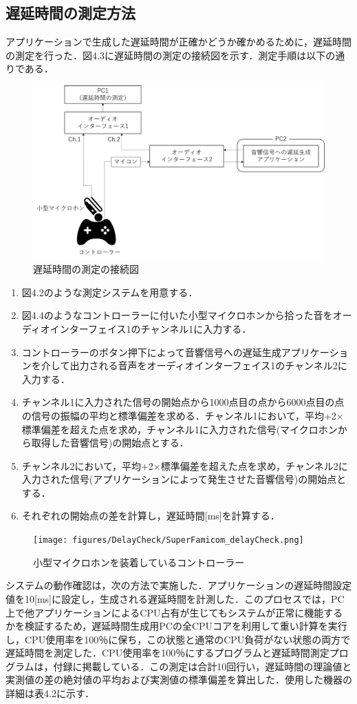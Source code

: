 \subsection{遅延時間の測定方法}
アプリケーションで生成した遅延時間が正確かどうか確かめるために，遅延時間の測定を行った．図4.3に遅延時間の測定の接続図を示す．測定手順は以下の通りである．
\begin{figure}[tb]
  \centering
  \includegraphics[scale=0.45]{figures/DelayCheck/DelayCheck_EX.png}
  \caption{遅延時間の測定の接続図}
\end{figure}
\begin{enumerate}[leftmargin=*]
  \item 図4.2のような測定システムを用意する．
  \item 図4.4のようなコントローラーに付いた小型マイクロホンから拾った音をオーディオインターフェイス1のチャンネル1に入力する．
  \item コントローラーのボタン押下によって音響信号への遅延生成アプリケーションを介して出力される音声をオーディオインターフェイス1のチャンネル2に入力する．
  \item チャンネル1に入力された信号の開始点から1000点目の点から6000点目の点の信号の振幅の平均と標準偏差を求める．チャンネル1において，平均+2×標準偏差を超えた点を求め，チャンネル1に入力された信号(マイクロホンから取得した音響信号)の開始点とする．
  \item チャンネル2において，平均+2×標準偏差を超えた点を求め，チャンネル2に入力された信号(アプリケーションによって発生させた音響信号)の開始点とする．
  \item それぞれの開始点の差を計算し，遅延時間[ms]を計算する．
\end{enumerate}
\begin{figure}[bt]
  \centering
  \texttt{[image: figures/DelayCheck/SuperFamicom\_delayCheck.png]}
  \caption{小型マイクロホンを装着しているコントローラー}
\end{figure}
システムの動作確認は，次の方法で実施した．アプリケーションの遅延時間設定値を10[ms]に設定し，生成される遅延時間を計測した．このプロセスでは，PC上で他アプリケーションによるCPU占有が生じてもシステムが正常に機能するかを検証するため，遅延時間生成用PCの全CPUコアを利用して重い計算を実行し，CPU使用率を100％に保ち，この状態と通常のCPU負荷がない状態の両方で遅延時間を測定した．CPU使用率を100％にするプログラムと遅延時間測定プログラムは，付録に掲載している．この測定は合計10回行い，遅延時間の理論値と実測値の差の絶対値の平均および実測値の標準偏差を算出した．使用した機器の詳細は表4.2に示す．
